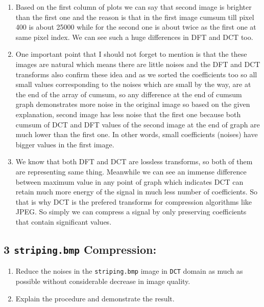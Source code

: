 \documentclass[11pt]{article}
\providecommand{\tightlist}{%
      \setlength{\itemsep}{0pt}\setlength{\parskip}{0pt}}
\begin{document}
    \begin{enumerate}
\def\labelenumi{\arabic{enumi}.}
\tightlist
\item
  Based on the first column of plots we can say that second image is
  brighter than the first one and the reason is that in the first image
  cumsum till pixel 400 is about 25000 while for the second one is about
  twice as the first one at same pixel index. We can see such a huge
  differences in DFT and DCT too.
\item
  One important point that I should not forget to mention is that the
  these images are natural which means there are little noises and the
  DFT and DCT transforms also confirm these idea and as we sorted the
  coefficients too so all small values corresponding to the noises which
  are small by the way, are at the end of the array of cumsum, so any
  difference at the end of cumsum graph demonstrates more noise in the
  original image so based on the given explanation, second image has
  less noise that the first one because both cumsum of DCT and DFT
  values of the second image at the end of graph are much lower than the
  first one. In other words, small coefficients (noises) have bigger
  values in the first image.
\item
  We know that both DFT and DCT are lossless transforms, so both of them
  are representing same thing. Meanwhile we can see an immense
  difference between maximum value in any point of graph which indicates
  DCT can retain much more energy of the signal in much less number of
  coefficients. So that is why DCT is the prefered transforms for
  compression algorithms like JPEG. So simply we can compress a signal
  by only preserving coefficients that contain significant values.
\end{enumerate}

    \hypertarget{striping.bmp-compression}{%
\subsection{\texorpdfstring{3 \texttt{striping.bmp}
Compression:}{3 striping.bmp Compression:}}\label{striping.bmp-compression}}

\begin{enumerate}
\def\labelenumi{\arabic{enumi}.}
\tightlist
\item
  Reduce the noises in the \texttt{striping.bmp} image in \texttt{DCT}
  domain as much as possible without considerable decrease in image
  quality.
\item
  Explain the procedure and demonstrate the result.
\end{enumerate}
\end{document}
